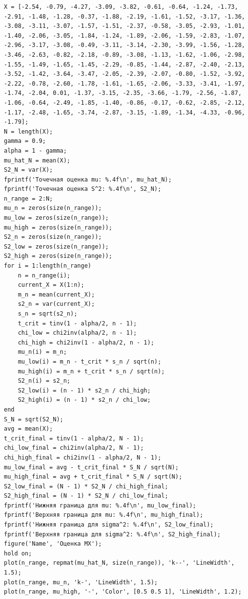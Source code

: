 \begin{lstlisting}[caption={Текст программы}, label={prog}]
X = [-2.54, -0.79, -4.27, -3.09, -3.82, -0.61, -0.64, -1.24, -1.73, -2.91, -1.48, -1.28, -0.37, -1.88, -2.19, -1.61, -1.52, -3.17, -1.36, -3.08, -3.11, -3.07, -1.57, -1.51, -2.37, -0.58, -3.05, -2.93, -1.01, -1.40, -2.06, -3.05, -1.84, -1.24, -1.89, -2.06, -1.59, -2.83, -1.07, -2.96, -3.17, -3.08, -0.49, -3.11, -3.14, -2.30, -3.99, -1.56, -1.28, -3.46, -2.63, -0.82, -2.18, -0.89, -3.08, -1.13, -1.62, -1.06, -2.98, -1.55, -1.49, -1.65, -1.45, -2.29, -0.85, -1.44, -2.87, -2.40, -2.13, -3.52, -1.42, -3.64, -3.47, -2.05, -2.39, -2.07, -0.80, -1.52, -3.92, -2.22, -0.78, -2.60, -1.78, -1.61, -1.65, -2.06, -3.33, -3.41, -1.97, -1.74, -2.04, 0.01, -1.37, -3.15, -2.35, -3.66, -1.79, -2.56, -1.87, -1.06, -0.64, -2.49, -1.85, -1.40, -0.86, -0.17, -0.62, -2.85, -2.12, -1.17, -2.48, -1.65, -3.74, -2.87, -3.15, -1.89, -1.34, -4.33, -0.96, -1.79];
N = length(X);
gamma = 0.9;
alpha = 1 - gamma;
mu_hat_N = mean(X);
S2_N = var(X);
fprintf('Точечная оценка mu: %.4f\n', mu_hat_N);
fprintf('Точечная оценка S^2: %.4f\n', S2_N);
n_range = 2:N;
mu_n = zeros(size(n_range));
mu_low = zeros(size(n_range));
mu_high = zeros(size(n_range));
S2_n = zeros(size(n_range));
S2_low = zeros(size(n_range));
S2_high = zeros(size(n_range));
for i = 1:length(n_range)
    n = n_range(i);
    current_X = X(1:n);
    m_n = mean(current_X);
    s2_n = var(current_X);
    s_n = sqrt(s2_n);
    t_crit = tinv(1 - alpha/2, n - 1);
    chi_low = chi2inv(alpha/2, n - 1);
    chi_high = chi2inv(1 - alpha/2, n - 1);
    mu_n(i) = m_n;
    mu_low(i) = m_n - t_crit * s_n / sqrt(n);
    mu_high(i) = m_n + t_crit * s_n / sqrt(n);
    S2_n(i) = s2_n;
    S2_low(i) = (n - 1) * s2_n / chi_high;
    S2_high(i) = (n - 1) * s2_n / chi_low;
end
S_N = sqrt(S2_N);
avg = mean(X);
t_crit_final = tinv(1 - alpha/2, N - 1);
chi_low_final = chi2inv(alpha/2, N - 1);
chi_high_final = chi2inv(1 - alpha/2, N - 1);
mu_low_final = avg - t_crit_final * S_N / sqrt(N);
mu_high_final = avg + t_crit_final * S_N / sqrt(N);
S2_low_final = (N - 1) * S2_N / chi_high_final;
S2_high_final = (N - 1) * S2_N / chi_low_final;
fprintf('Нижняя граница для mu: %.4f\n', mu_low_final);
fprintf('Верхняя граница для mu: %.4f\n', mu_high_final);
fprintf('Нижняя граница для sigma^2: %.4f\n', S2_low_final);
fprintf('Верхняя граница для sigma^2: %.4f\n', S2_high_final);
figure('Name', 'Оценка MX');
hold on;
plot(n_range, repmat(mu_hat_N, size(n_range)), 'k--', 'LineWidth', 1.5);
plot(n_range, mu_n, 'k-', 'LineWidth', 1.5);
plot(n_range, mu_high, '-', 'Color', [0.5 0.5 1], 'LineWidth', 1.2);

\end{lstlisting}
